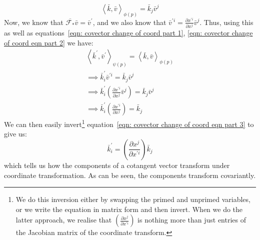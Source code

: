       \begin{equation}
        \label{eqn: covector change of coord eqn part 2}
        \left\langle \bar{k}, \bar{v}\right\rangle_{\phi(p)} = \bar{k}_j
        \bar{v}^j
      \end{equation}
      Now, we know that $\overline{\mathcal{F}_*}\bar{v} = \bar{v}^\prime$,
      and we also know that $\bar{v}^{\prime i} = \frac{\partial x^{\prime
      i}}{\partial x^j} \bar{v}^j$. Thus, using this as well as
      equations~\ref{eqn: covector change of coord part 1}, \ref{eqn:
      covector change of coord eqn part 2} we have:
      \begin{gather}
        \left\langle \bar{k}^\prime, \bar{v}^\prime\right\rangle_{\psi(p)} =
        \left\langle \bar{k}, \bar{v}\right\rangle_{\phi(p)} \nonumber\\
        \implies \bar{k}_{i}^{\prime} \bar{v}^{\prime i} = \bar{k}_j
        \bar{v}^j \nonumber\\
        \implies \bar{k}_{i}^{\prime} \left(\frac{\partial x^{\prime
        i}}{\partial x^j} \bar{v}^j \right) = \bar{k}_j \bar{v}^j \nonumber\\
        \implies \bar{k}_{i}^{\prime} \left(\frac{\partial x^{\prime
        i}}{\partial x^j} \right) = \bar{k}_j \label{eqn: covector change of coord eqn part 3}
      \end{gather}
      We can then easily invert\footnote{We do this inversion either by
      swapping the primed and unprimed variables, or we write the equation in
      matrix form and then invert. When we do the latter approach, we realise
      that $\left(\frac{\partial x^j}{\partial x^{\prime i}} \right)$ is
      nothing more than just entries of the Jacobian matrix of the coordinate
      transform.} equation~\ref{eqn: covector change of coord eqn part 3} to
      give us:
      \begin{equation}
        \bar{k}_{i}^{\prime} = \left(\frac{\partial x^j}{\partial x^{\prime
        i}} \right) \bar{k}_j
      \end{equation}
      which tells us how the components of a cotangent vector transform under
      coordinate transformation. As can be seen, the components transform
      covariantly.
